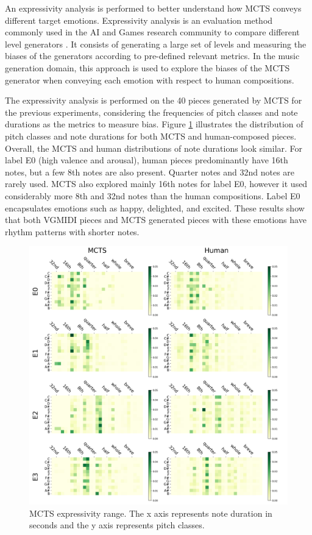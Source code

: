 An expressivity analysis is performed to better understand how MCTS conveys different target emotions. Expressivity analysis is an evaluation method commonly used in the AI and Games research community to compare different level generators \cite{smith2010analyzing}.  It consists of generating a large set of levels and measuring the biases of the generators according to pre-defined relevant metrics. In the music generation domain, this approach is used to explore the biases of the MCTS generator when conveying each emotion with respect to human compositions.

The expressivity analysis is performed on the 40 pieces generated by MCTS for the previous experiments, considering the frequencies of pitch classes and note durations as the metrics to measure bias. Figure \ref{fig:expressivity} illustrates the distribution of pitch classes and note durations for both MCTS and human-composed pieces. Overall, the MCTS and human distributions of note durations look similar. For label E0 (high valence and arousal), human pieces predominantly have 16th notes, but a few 8th notes are also present. Quarter notes and 32nd notes are rarely used. MCTS also explored mainly 16th notes for label E0, however it used considerably more 8th and 32nd notes than the human compositions. Label E0 encapsulates emotions such as happy, delighted, and excited. These results show that both VGMIDI pieces and MCTS generated pieces with these emotions have rhythm patterns with shorter notes.

\begin{figure}[h]
\centering
 \includegraphics[width=0.8\columnwidth]{imgs/ismir21/mcts_human.png}
   \caption{MCTS expressivity range. The x axis represents note duration in seconds and the y axis represents pitch classes. }
 \label{fig:expressivity}
\end{figure}

